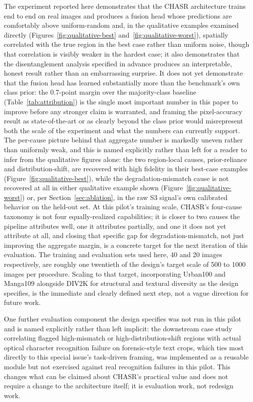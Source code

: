 \documentclass[review]{elsarticle}
\begin{document}
The experiment reported here demonstrates that the CHASR architecture trains end to end on real images and produces a fusion head whose predictions are comfortably above uniform-random and, in the qualitative examples examined directly (Figures~\ref{fig:qualitative-best} and~\ref{fig:qualitative-worst}), spatially correlated with the true region in the best case rather than uniform noise, though that correlation is visibly weaker in the hardest case; it also demonstrates that the disentanglement analysis specified in advance produces an interpretable, honest result rather than an embarrassing surprise. It does not yet demonstrate that the fusion head has learned substantially more than the benchmark's own class prior: the 0.7-point margin over the majority-class baseline (Table~\ref{tab:attribution}) is the single most important number in this paper to improve before any stronger claim is warranted, and framing the pixel-accuracy result as state-of-the-art or as clearly beyond the class prior would misrepresent both the scale of the experiment and what the numbers can currently support. The per-cause picture behind that aggregate number is markedly uneven rather than uniformly weak, and this is named explicitly rather than left for a reader to infer from the qualitative figures alone: the two region-local causes, prior-reliance and distribution-shift, are recovered with high fidelity in their best-case examples (Figure~\ref{fig:qualitative-best}), while the degradation-mismatch cause is not recovered at all in either qualitative example shown (Figure~\ref{fig:qualitative-worst}) or, per Section~\ref{sec:ablation}, in the raw S3 signal's own calibrated behavior on the held-out set. At this pilot's training scale, CHASR's four-cause taxonomy is not four equally-realized capabilities; it is closer to two causes the pipeline attributes well, one it attributes partially, and one it does not yet attribute at all, and closing that specific gap for degradation-mismatch, not just improving the aggregate margin, is a concrete target for the next iteration of this evaluation. The training and evaluation sets used here, 40 and 20 images respectively, are roughly one twentieth of the design's target scale of 500 to 1000 images per procedure. Scaling to that target, incorporating Urban100 and Manga109 alongside DIV2K for structural and textural diversity as the design specifies, is the immediate and clearly defined next step, not a vague direction for future work.

One further evaluation component the design specifies was not run in this pilot and is named explicitly rather than left implicit: the downstream case study correlating flagged high-mismatch or high-distribution-shift regions with actual optical character recognition failure on forensic-style text crops, which ties most directly to this special issue's task-driven framing, was implemented as a reusable module but not exercised against real recognition failures in this pilot. This changes what can be claimed about CHASR's practical value and does not require a change to the architecture itself; it is evaluation work, not redesign work.
\end{document}
